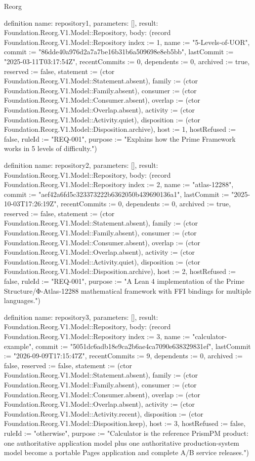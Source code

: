 \begin{lexlean}{Reorg}
\begin{semanticmodule}
definition{
  name: repository1,
  parameters: [],
  result: Foundation.Reorg.V1.Model::Repository,
  body: (record Foundation.Reorg.V1.Model::Repository {index := 1, name := "5-Levels-of-UOR", commit := "86dde40a976d2a7a7be16b31b6a509698e8eb5bb", lastCommit := "2025-03-11T03:17:54Z", recentCommits := 0, dependents := 0, archived := true, reserved := false, statement := (ctor Foundation.Reorg.V1.Model::Statement.absent), family := (ctor Foundation.Reorg.V1.Model::Family.absent), consumer := (ctor Foundation.Reorg.V1.Model::Consumer.absent), overlap := (ctor Foundation.Reorg.V1.Model::Overlap.absent), activity := (ctor Foundation.Reorg.V1.Model::Activity.quiet), disposition := (ctor Foundation.Reorg.V1.Model::Disposition.archive), host := 1, hostRefused := false, ruleId := "REQ-001", purpose := "Explains how the Prime Framework works in 5 levels of difficulty."})
}

definition{
  name: repository2,
  parameters: [],
  result: Foundation.Reorg.V1.Model::Repository,
  body: (record Foundation.Reorg.V1.Model::Repository {index := 2, name := "atlas-12288", commit := "aef42a6fd5c323373222b6362050b439690136a1", lastCommit := "2025-10-03T17:26:19Z", recentCommits := 0, dependents := 0, archived := true, reserved := false, statement := (ctor Foundation.Reorg.V1.Model::Statement.absent), family := (ctor Foundation.Reorg.V1.Model::Family.absent), consumer := (ctor Foundation.Reorg.V1.Model::Consumer.absent), overlap := (ctor Foundation.Reorg.V1.Model::Overlap.absent), activity := (ctor Foundation.Reorg.V1.Model::Activity.quiet), disposition := (ctor Foundation.Reorg.V1.Model::Disposition.archive), host := 2, hostRefused := false, ruleId := "REQ-001", purpose := "A Lean 4 implementation of the Prime Structure/Φ-Atlas-12288 mathematical framework with FFI bindings for multiple languages."})
}

definition{
  name: repository3,
  parameters: [],
  result: Foundation.Reorg.V1.Model::Repository,
  body: (record Foundation.Reorg.V1.Model::Repository {index := 3, name := "calculator-example", commit := "5051dc6adb18e9ca2b6ae4ca7090e638329831ef", lastCommit := "2026-09-09T17:15:47Z", recentCommits := 9, dependents := 0, archived := false, reserved := false, statement := (ctor Foundation.Reorg.V1.Model::Statement.absent), family := (ctor Foundation.Reorg.V1.Model::Family.absent), consumer := (ctor Foundation.Reorg.V1.Model::Consumer.absent), overlap := (ctor Foundation.Reorg.V1.Model::Overlap.absent), activity := (ctor Foundation.Reorg.V1.Model::Activity.recent), disposition := (ctor Foundation.Reorg.V1.Model::Disposition.keep), host := 3, hostRefused := false, ruleId := "otherwise", purpose := "Calculator is the reference PrismPM product: one authoritative application model plus one authoritative production-system model become a portable Pages application and complete A/B service releases."})
}


\end{semanticmodule}
\end{lexlean}
